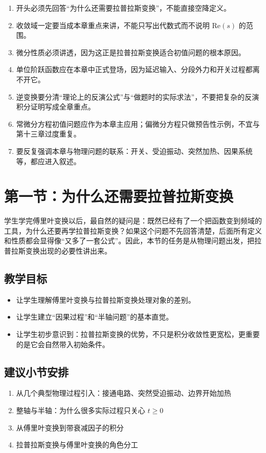 \begin{tishi}[写作总原则]
\begin{enumerate}
    \item 开头必须先回答``为什么还需要拉普拉斯变换''，不能直接空降定义。
    \item 收敛域一定要当成本章重点来讲，不能只写出代数式而不说明 $\mathrm{Re}(s)$ 的范围。
    \item 微分性质必须讲透，因为这正是拉普拉斯变换适合初值问题的根本原因。
    \item 单位阶跃函数应在本章中正式登场，因为延迟输入、分段外力和开关过程都离不开它。
    \item 逆变换要分清``理论上的反演公式''与``做题时的实际求法''，不要把复杂的反演积分证明写成全章重点。
    \item 常微分方程初值问题应作为本章主应用；偏微分方程只做预告性示例，不宜与第十三章过度重复。
    \item 要反复强调本章与物理问题的联系：开关、受迫振动、突然加热、因果系统等，都应进入叙述。
\end{enumerate}
\end{tishi}

\section{第一节：为什么还需要拉普拉斯变换}

\begin{wulibj}[本节要解决的问题]
学生学完傅里叶变换以后，最自然的疑问是：既然已经有了一个把函数变到频域的工具，为什么还要再学拉普拉斯变换？如果这个问题不先回答清楚，后面所有定义和性质都会显得像``又多了一套公式''。因此，本节的任务是从物理问题出发，把拉普拉斯变换出现的必要性讲出来。
\end{wulibj}

\subsection*{教学目标}
\begin{itemize}
    \item 让学生理解傅里叶变换与拉普拉斯变换处理对象的差别。
    \item 让学生建立``因果过程''和``半轴问题''的基本直觉。
    \item 让学生初步意识到：拉普拉斯变换的优势，不只是积分收敛性更宽松，更重要的是它会自然带入初始条件。
\end{itemize}

\subsection*{建议小节安排}
\begin{enumerate}
    \item 从几个典型物理过程引入：接通电路、突然受迫振动、边界开始加热
    \item 整轴与半轴：为什么很多实际过程只关心 $t\ge 0$
    \item 从傅里叶变换到带衰减因子的积分
    \item 拉普拉斯变换与傅里叶变换的角色分工
\end{enumerate}

